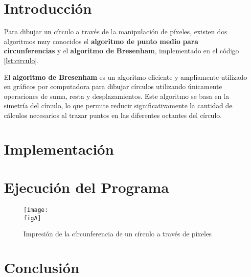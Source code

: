     \restoregeometry %

    \clearpage
    \tableofcontents

    \clearpage
    \listoffigures


    \clearpage
    \lstlistoflistings

    \clearpage
    \vspace*{6pt}
	\centerline{\textbf{\huge \theTitle}}
    \vspace*{8pt}

	\section{Introducción}

	Para dibujar un círculo a través de la manipulación de píxeles, existen dos
	algoritmos muy conocidos el \textbf{algoritmo de punto medio para
	circunferencias} y el \textbf{algoritmo de Bresenham}, implementado en el
	código \ref{lst:circulo}.

	El \textbf{algoritmo de Bresenham} es un algoritmo eficiente y ampliamente
	utilizado en gráficos por computadora para dibujar círculos utilizando
	únicamente operaciones de suma, resta y desplazamientos. Este algoritmo se basa
	en la simetría del círculo, lo que permite reducir significativamente la
	cantidad de cálculos necesarios al trazar puntos en las diferentes octantes del
	círculo.

	\clearpage
	\section{Implementación}

	

	\clearpage
	\section{Ejecución del Programa}

	\begin{figure}[h]
		\centering
		\texttt{[image: \\figA]}
		\caption{Impresión de la círcunferencia de un círculo a través de píxeles}
	\end{figure}

	\clearpage
	\section{Conclusión}


